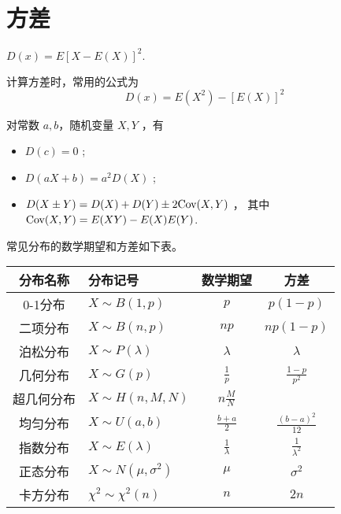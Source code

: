 \section{方差}

\begin{Def}[方差]

    $ D(x) = E[X-E(X)]^2. $ 
\end{Def}

计算方差时，常用的公式为$$
    D(x) = E(X^2) - [E(X)]^2
$$ 

对常数 $ a,b $，随机变量 $ X,Y $ ，有\begin{itemize}
    \item $ D(c) = 0 $ ;
    \item $ D(aX+b) = a^2D(X) $ ;
    \item $ D(X\pm Y) = D(X) + D(Y) \pm 2\textrm{Cov}(X,Y) $ ，
    其中 $ \textrm{Cov}(X,Y) = E(XY) - E(X)E(Y) $.
\end{itemize}

常见分布的数学期望和方差如下表。

\begin{table}[!htbp]\centering
    \begin{tabular}{clcc}
    \toprule
    分布名称  & 分布记号                  & 数学期望           & 方差                         \\ \midrule
    0-1分布   &$  X\sim B(1,p) $           & $ p   $             & $ p(1-p)    $               \\
    二项分布  & $ X\sim B(n,p)   $         & $ np   $            & $ np(1-p)  $             \\
    泊松分布  &$  X\sim P(\lambda) $       & $ \lambda    $      & $ \lambda    $           \\
    几何分布  & $ X \sim G(p)  $           & $ \frac 1p  $      & $ \frac{1-p}{p^2}  $    \\
    超几何分布 & $ X \sim H(n,M,N)    $     &$  n\frac MN  $     &                         \\
    均匀分布  & $ X\sim U(a,b) $           & $ \frac{b+a}2  $   &$  \frac{(b-a)^2}{12} $  \\
    指数分布  &$  X\sim E(\lambda)   $     & $ \frac1\lambda $  & $ \frac1{\lambda^2} $   \\
    正态分布  & $ X\sim N(\mu,\sigma^2) $  & $ \mu $             &$  \sigma^2    $          \\
    卡方分布  & $ \chi^2\sim \chi^2(n)  $  & $ n $               & $ 2n    $                \\ \bottomrule
    \end{tabular}
\end{table}

